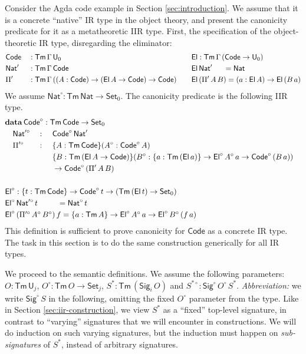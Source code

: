 \documentclass[acmsmall,screen,review,anonymous]{acmart}
\newcommand{\msf}[1]{{\mathsf{#1}}}
\newcommand{\mbf}[1]{{\mathbf{#1}}}
\newcommand{\data}{\mbf{data}}
\newcommand{\U}{\msf{U}}
\newcommand{\Set}{\msf{Set}}
\newcommand{\Nat}{\msf{Nat}}
\newcommand{\El}{\msf{El}}
\newcommand{\Sig}{\msf{Sig}}
\newcommand{\Code}{\msf{Code}}
\newcommand{\Tm}{\msf{Tm}}
\newcommand{\w}{\circ}
\begin{document}
\begin{example}\label{ex:code-canonicity}
Consider the Agda code example in Section \ref{sec:introduction}. We assume that it is a concrete
``native'' IR type in the object theory, and present the canonicity predicate for it as a
metatheoretic IIR type. First, the specification of the object-theoretic IR type, disregarding the
eliminator:
\begin{alignat*}{4}
  &\Code &&: \Tm\,\Gamma\,\U_0 && \El : \Tm\,\Gamma\,(\Code \to \U_0) \\
  &\Nat' &&: \Tm\,\Gamma\,\Code && \El\,\Nat'\hspace{1.5em} = \Nat \\
  &\Pi'  &&: \Tm\,\Gamma\,((A : \Code) \to (\El\,A \to \Code) \to \Code)\hspace{1em} && \El\,(\Pi'\,A\,B) = (a : \El\,A) \to \El\,(B\,a)
\end{alignat*}
We assume $\Nat^\w : \Tm\,\Nat \to \Set_0$. The canonicity predicate is the following IIR type.
\begin{alignat*}{4}
  &\rlap{$\data\,\Code^\w : \Tm\,\Code \to \Set_0$}\\
  &\quad\Nat'^\w &&: \,\,&& \Code^\w\,\Nat'\\
  &\quad\Pi'^\w  &&: \,\,&&\{A : \Tm\,\Code\}(A^\w : \Code^\w\,A)\\
  &\quad         &&  && \{B : \Tm\,(\El\,A \to \Code)\}(B^\w : \{a : \Tm\,(\El\,a)\} \to \El^\w\,A^\w\,a \to \Code^\w\,(B\,a))\\
  &\quad         &&  && \to \Code^\w\,(\Pi'\,A\,B)\\
  &\rlap{}\\
  &\rlap{$\El^\w : \{t : \Tm\,\Code\} \to \Code^\w\,t \to (\Tm\,(\El\,t) \to \Set_0)$}\\
  &\rlap{$\El^\w\,\Nat'^\w\,t \hspace{2.55em}= \Nat^\w\,t$}  \\
  &\rlap{$\El^\w\,(\Pi'^\w\,A^\w\,B^\w)\,f = \{a : \Tm\,A\} \to \El^\w\,A^\w\,a \to \El^\w\,B^\w\,(f\,a)$}
\end{alignat*}
This definition is sufficient to prove canonicity for $\Code$ as a concrete IR type. The task
in this section is to do the same construction generically for all IR types.
\end{example}

We proceed to the semantic definitions. We assume the following parameters: $O : \Tm\,\U_j$, $O^\w :
\Tm\,O \to \Set_j$, $S^* : \Tm\,(\Sig_i\,O)$ and $S^{*\w} :
\Sig^\w\,O^\w\,S^*$. \emph{Abbreviation:} we write $\Sig^\w\,S$ in the following, omitting the fixed
$O^\w$ parameter from the type.  Like in Section \ref{sec:iir-construction}, we view $S^*$ as a
``fixed'' top-level signature, in contrast to ``varying'' signatures that we will encounter in
constructions. We will do induction on such varying signatures, but the induction must happen on
\emph{sub-signatures} of $S^*$, instead of arbitrary signatures.
\end{document}
